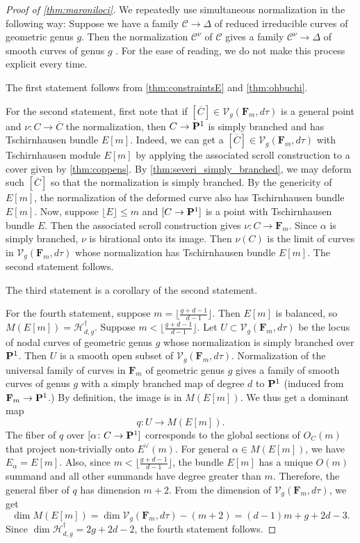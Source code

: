 \documentclass{article}
\renewcommand {\P}{{\bf P}}
\providecommand {\from}{{\colon}}
\renewcommand{\H}{\mathcal H}
\newcommand{\V}{\mathcal V}
\newcommand{\F}{{\mathbf F}}
\numberwithin{equation}{section}
\begin{document}
\begin{proof}[Proof of \autoref{thm:maroniloci}]
We repeatedly use simultaneous normalization in the following way: Suppose we have a family $\mathcal C \to \Delta$ of reduced irreducible curves of geometric genus $g$. Then the normalization $\mathcal C^\nu$ of $\mathcal C$ gives a family $\mathcal C^\nu \to \Delta$ of smooth curves of genus $g$ \cite{teissier80:_resol_i}. For the ease of reading, we do not make this process explicit every time.
  

The first statement follows from \autoref{thm:constraintsE} and \autoref{thm:ohbuchi}. 
  
For the second statement, first note that if $[\overline C] \in \V_g(\F_m,d\tau)$ is a general point and $\nu \from C \to \overline C$ the normalization, then $C \to \P^1$ is simply branched and has Tschirnhausen bundle $E[m]$. Indeed, we can get a $[\overline C] \in \V_g(\F_m,d\tau)$ with Tschirnhausen module $E[m]$ by applying the associated scroll construction to a cover given by \autoref{thm:coppens}. By \autoref{thm:severi_simply_branched}, we may deform such $[\overline C]$ so that the normalization is simply branched. By the genericity of $E[m]$, the normalization of the deformed curve also has Tschirnhausen bundle $E[m]$. Now, suppose $\lfloor E \rfloor \leq m$ and $[C \to \P^1]$ is a point with Tschirnhausen bundle $E$. Then the associated scroll construction gives $\nu \from C \to \F_m$. Since $\alpha$ is simply branched, $\nu$ is birational onto its image. Then $\nu(C)$ is the limit of curves in $\V_g(\F_m,d\tau)$ whose normalization has Tschirnhausen bundle $E[m]$. The second statement follows.

The third statement is a corollary of the second statement.
 
For the fourth statement, suppose $m = \lfloor \frac{g+d-1}{d-1} \rfloor$. Then $E[m]$ is balanced, so $M(E[m]) = \H_{d,g}^\dagger$.  Suppose $m < \lfloor \frac{g+d-1}{d-1} \rfloor$. Let $U \subset \V_g(\F_m,d\tau)$ be the locus of nodal curves of geometric genus $g$ whose normalization is simply branched over $\P^1$. Then $U$ is a smooth open subset of $\V_g(\F_m,d\tau)$. Normalization of the universal family of curves in $\F_m$ of geometric genus $g$ gives a family of smooth curves of genus $g$ with a simply branched map of degree $d$ to $\P^1$ (induced from $\F_m \to \P^1$.) By definition, the image is in $M(E[m])$. We thus get a dominant map 
\[ q \from U \to M(E[m]).\]
The fiber of $q$ over $[\alpha \from C \to \P^1]$ corresponds to the global sections of $O_C(m)$ that project non-trivially onto $E^\vee(m)$. For general $\alpha \in M(E[m])$, we have $E_\alpha = E[m]$. Also, since $m < \lfloor \frac{g+d-1}{d-1} \rfloor$, the bundle $E[m]$ has a unique $O(m)$ summand and all other summands have degree greater than $m$. Therefore, the general fiber of $q$ has dimension $m+2$. From the dimension of $\V_g(\F_m,d\tau)$, we get
\[ \dim M(E[m]) = \dim \V_g(\F_m,d\tau) - (m+2) = (d-1)m + g + 2d - 3.\]
Since $\dim \H^\dagger_{d,g} = 2g+2d-2$, the fourth statement follows.
 

\end{proof}
\end{document}
